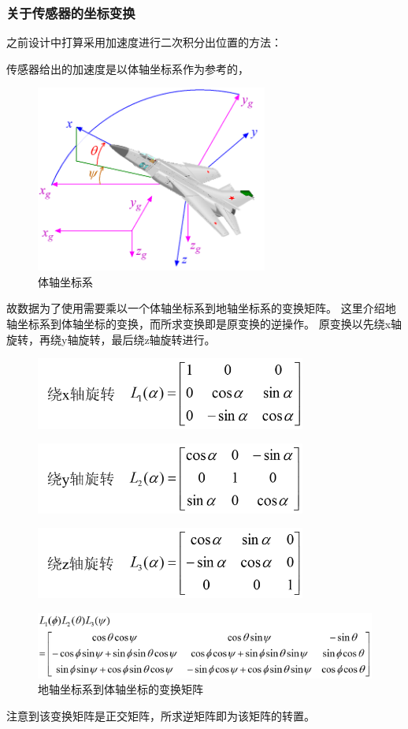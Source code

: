 \documentclass[UTF8]{article}
\begin{document}
\subsubsection{关于传感器的坐标变换}
之前设计中打算采用加速度进行二次积分出位置的方法：\par
传感器给出的加速度是以体轴坐标系作为参考的，\par
	\begin{figure}[H]
		\centering
		\includegraphics[width=3in]{2-4.png}
			\caption{体轴坐标系}	
	\end{figure}
故数据为了使用需要乘以一个体轴坐标系到地轴坐标系的变换矩阵。
这里介绍地轴坐标系到体轴坐标的变换，而所求变换即是原变换的逆操作。
原变换以先绕x轴旋转，再绕y轴旋转，最后绕z轴旋转进行。
	\begin{figure}[H]
		\centering
		\includegraphics[width=3.5in]{2-5.png}
	\end{figure}
	\begin{figure}[H]
		\centering
		\includegraphics[width=3.5in]{2-6.png}
	\end{figure}
	\begin{figure}[H]
		\centering
		\includegraphics[width=3.5in]{2-7.png}
	\end{figure}
	\begin{figure}[H]
		\centering
		\includegraphics[width=\linewidth]{2-8.png}
			\caption{地轴坐标系到体轴坐标的变换矩阵}	
	\end{figure}
注意到该变换矩阵是正交矩阵，所求逆矩阵即为该矩阵的转置。
\end{document}
